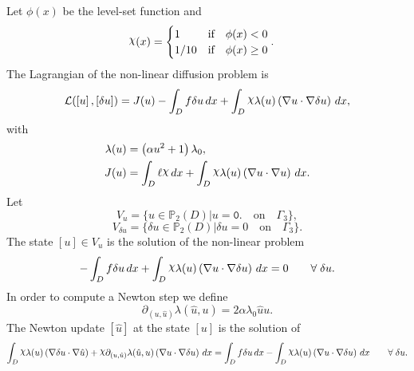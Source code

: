 \documentclass[preview]{standalone}
\let\oldcdot\cdot
\let\cdot\oldcdot
\begin{document}
Let $\phi(x)$ be the level-set function and
 \begin{align*}\raisebox{\depth}{$\chi$}(x) &= \begin{cases} 1 & \mbox{if}\quad \phi(x) < 0 \\ 1/10 & \mbox{if}\quad \phi(x)  \ge 0 \end{cases}.\end{align*}
The Lagrangian of the non-linear diffusion problem is
\begin{dmath*}
\mathcal L(\left[ u\right],\left[ \delta u\right]) = J(u) -  \int_{D} f \delta u \,dx +  \int_{D} \raisebox{\depth}{$\chi$} \lambda(u) \left(  \nabla u  \cdot  \nabla \delta u  \right) \,dx , 
\end{dmath*}
with 
\begin{align*}
\lambda(u) &= \left(\alpha u^{2} + 1\right) \lambda_{0},\\
J(u) &=  \int_{D} \ell \raisebox{\depth}{$\chi$} \,dx +  \int_{D} \raisebox{\depth}{$\chi$} \lambda(u) \left(  \nabla u  \cdot  \nabla u  \right) \,dx.
 \end{align*}
Let
\begin{equation*}
V_{u} = \{ u \in \mathbb P_{2}(D)| u = \mathtt{\text{0.}}  \quad \text{{on}} \quad\Gamma_{3} \},\end{equation*}
\begin{equation*}
V_{\delta u} = \{ \delta u \in \mathbb P_{2}(D)| \delta u = 0  \quad \text{{on}} \quad\Gamma_{3} \}.\end{equation*}
The state $\left[ u\right] \in  V_{u}$ is the solution of the non-linear problem
\begin{dmath*}
-  \int_{D} f \delta u \,dx +  \int_{D} \raisebox{\depth}{$\chi$} \lambda(u) \left(  \nabla u  \cdot  \nabla \delta u  \right) \,dx = 0\qquad \forall\; \delta u . 
\end{dmath*}
In order to compute a Newton step we define
\begin{dmath*}
\partial_{(u,\hat u)} \lambda(\hat u,u) = 2 \alpha \lambda_{0} \hat u u.
 \end{dmath*}
The Newton update $\left[ \hat u\right]$ at the state $\left[ u\right]$ is the solution of
\begin{dmath*}
 \int_{D} \raisebox{\depth}{$\chi$} \lambda(u) \left(  \nabla \delta u  \cdot  \nabla \hat u  \right) + \raisebox{\depth}{$\chi$} \partial_{(u,\hat u)} \lambda(\hat u,u) \left(  \nabla u  \cdot  \nabla \delta u  \right) \,dx =  \int_{D} f \delta u \,dx -  \int_{D} \raisebox{\depth}{$\chi$} \lambda(u) \left(  \nabla u  \cdot  \nabla \delta u  \right) \,dx\qquad \forall\; \delta u . 
\end{dmath*}
\end{document}
